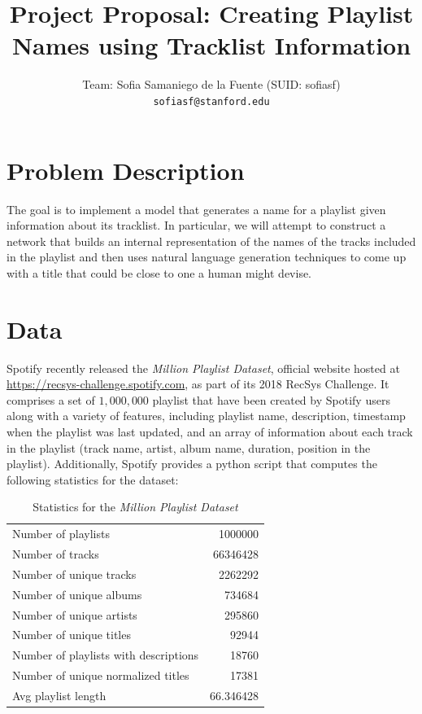\documentclass{article} %
\title{Project Proposal: Creating Playlist Names using Tracklist Information}
\author{
    Team: Sofia Samaniego de la Fuente (SUID: sofiasf) \\
    \texttt{\footnotesize sofiasf@stanford.edu} \\
}
\begin{document}
\maketitle


\section{Problem Description}
\label{description}
The goal is to implement a model that generates a name for a playlist given information about its tracklist. 
In particular, we will attempt to construct a network that builds an internal representation of the names of the tracks included in the playlist and then uses natural language generation techniques to come up with a title that could be close to one a human might devise. 

\section{Data}
\label{data}
Spotify recently released the \emph{Million Playlist Dataset}, official website hosted at \href{https://recsys-challenge.spotify.com}{https://recsys-challenge.spotify.com}, as part of its 2018 RecSys Challenge.
It comprises a set of $1,000,000$ playlist that have been created by Spotify users along with a variety of features, including playlist name, description, timestamp when the playlist was last updated, and an array of information about each track in the playlist (track name, artist, album name, duration, position in the playlist).
Additionally, Spotify provides a \textsf{python} script that computes the following statistics for the dataset:

\begin{table}[h!]
\caption{Statistics for the \emph{Million Playlist Dataset}}
\centering
 \begin{tabular}{|lr|} 
 \hline
 	Number of playlists & 1000000 \\
	Number of tracks & 66346428 \\
	Number of unique tracks & 2262292 \\
	Number of unique albums & 734684 \\
	Number of unique artists & 295860 \\
	Number of unique titles & 92944 \\
	Number of playlists with descriptions & 18760 \\
	Number of unique normalized titles & 17381 \\
	Avg playlist length & 66.346428 \\     
 \hline
 \end{tabular}
\end{table}
\end{document}
